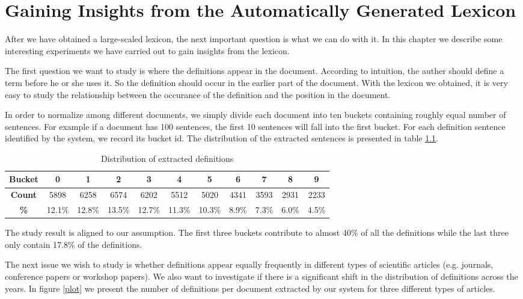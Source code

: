 \documentclass[hyp]{socreport}
\begin{document}
\chapter{Gaining Insights from the Automatically Generated Lexicon}
After we have obtained a large-scaled lexicon, the next important question is what we can do with it. In this chapter we describe some interesting experiments we have carried out to gain insights from the lexicon.

The first question we want to study is where the definitions appear in the document. According to intuition, the auther should define a term before he or she uses it. So the definition should occur in the earlier part of the document. With the lexicon we obtained, it is very easy to study the relationship between the occurance of the definition and the position in the document. 

In order to normalize among different documents, we simply divide each document into ten buckets containing roughly equal number of sentences. For example if a document has 100 sentences, the first 10 sentences will fall into the first bucket. For each definition sentence identified by the system, we record its bucket id. The distribution of the extracted sentences is presented in table \ref{distribution}.   

\begin{table}
	
    \centering
\begin{tabular}{|c|c|c|c|c|c|c|c|c|c|c|} 
\hline 
 \bf{Bucket} &0 &1 & 2 & 3 & 4 & 5 & 6 & 7 & 8 & 9 \\ \hline 
 \bf{Count} &5898 &6258 & 6574 & 6202 & 5512 & 5020 & 4341 & 3593 & 2931 & 2233 \\ \hline
 \bf{\%} &12.1\% &12.8\% & 13.5\% & 12.7\% & 11.3\% & 10.3\% & 8.9\% & 7.3\% & 6.0\% & 4.5\% \\ \hline 
    \end{tabular}
    \caption{Distribution of extracted definitions}
    \label{distribution}
\end{table}


The study result is aligned to our assumption. The first three buckets contribute to almost 40\% of all the definitions while the last three only contain 17.8\% of the definitions.   

The next issue we wish to study is whether definitions appear equally frequently in different types of scientific articles (e.g. journals, conference papers or workshop papers). We also want to investigate if there is a significant shift in the distribution of definitions across the years. In figure \ref{plot} we present the number of definitions per document extracted by our system for three different types of articles. 
\end{document}
